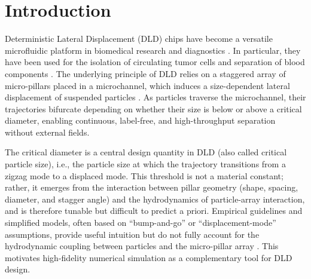 \documentclass{article}
\begin{document}
\section{Introduction}
Deterministic Lateral Displacement (DLD) chips have become   a versatile microfluidic platform in biomedical research and diagnostics \cite{huang2004continuous}. In particular, they have been used for the  isolation of circulating tumor cells and separation of blood components \cite{xiang2019precise,liu2018integrated,tang2022topology,gioe2022deterministic,hochstetter2020deterministic}. The underlying principle of DLD relies on a staggered array of micro-pillars placed in a  microchannel, which induces a size-dependent lateral displacement of suspended particles \cite{hochstetter2020deterministic}. As particles traverse  the microchannel, their trajectories bifurcate depending on whether their size is below or above a  critical  diameter, enabling continuous, label-free, and high-throughput separation without external fields.

The critical diameter is a central design quantity in DLD (also called critical particle size), i.e., the particle size at which the trajectory transitions from a zigzag mode to a displaced mode. This threshold is not a material constant; rather, it emerges from the interaction between pillar geometry (shape, spacing, diameter, and stagger angle) and the hydrodynamics of particle-array interaction, and is therefore tunable but difficult to predict a priori. Empirical guidelines and simplified models, often based on ``bump-and-go'' or ``displacement-mode'' assumptions, provide useful intuition but do not fully account for the hydrodynamic coupling between particles and the micro-pillar array  \cite{rezaei2021numerical, pariset2017anticipating}. This motivates high-fidelity numerical simulation as a complementary tool for DLD design.
\end{document}
